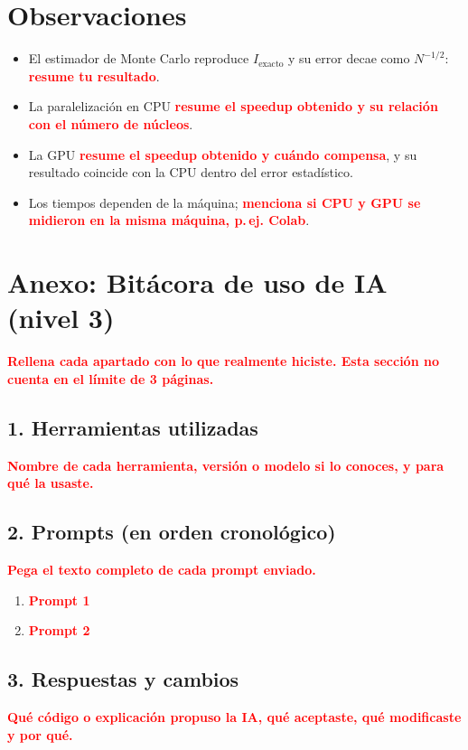 \documentclass[11pt,a4paper]{article}
\newcommand{\pend}[1]{\textcolor{red}{\textbf{#1}}}
\begin{document}
\section{Observaciones}
\begin{itemize}
\item El estimador de Monte Carlo reproduce $I_{\text{exacto}}$ y su error decae como $N^{-1/2}$: \pend{resume tu resultado}.
\item La paralelización en CPU \pend{resume el speedup obtenido y su relación con el número de núcleos}.
\item La GPU \pend{resume el speedup obtenido y cuándo compensa}, y su resultado coincide con la CPU dentro del error estadístico.
\item Los tiempos dependen de la máquina; \pend{menciona si CPU y GPU se midieron en la misma máquina, p.\,ej. Colab}.
\end{itemize}

\appendix
\newpage
\section*{Anexo: Bitácora de uso de IA (nivel 3)}
\pend{Rellena cada apartado con lo que realmente hiciste. Esta sección no cuenta en el límite de 3 páginas.}

\subsection*{1. Herramientas utilizadas}
\pend{Nombre de cada herramienta, versión o modelo si lo conoces, y para qué la usaste.}

\subsection*{2. Prompts (en orden cronológico)}
\pend{Pega el texto completo de cada prompt enviado.}
\begin{enumerate}
\item \pend{Prompt 1}
\item \pend{Prompt 2}
\end{enumerate}

\subsection*{3. Respuestas y cambios}
\pend{Qué código o explicación propuso la IA, qué aceptaste, qué modificaste y por qué.}
\end{document}
